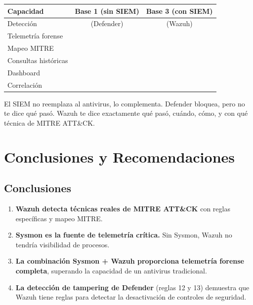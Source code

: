 \documentclass[11pt,a4paper]{article}
\begin{document}
	\begin{table}[H]
		\centering
		\begin{tabular}{@{}lcc@{}}
			\toprule
			\textbf{Capacidad} & \textbf{Base 1 (sin SIEM)} & \textbf{Base 3 (con SIEM)} \\ \midrule
			Detección & \textcolor{purplegreen}{\checkmark} (Defender) & \textcolor{purplegreen}{\checkmark} (Wazuh) \\
			Telemetría forense & \textcolor{purplered}{\texttimes} & \textcolor{purplegreen}{\checkmark} \\
			Mapeo MITRE & \textcolor{purplered}{\texttimes} & \textcolor{purplegreen}{\checkmark} \\
			Consultas históricas & \textcolor{purplered}{\texttimes} & \textcolor{purplegreen}{\checkmark} \\
			Dashboard & \textcolor{purplered}{\texttimes} & \textcolor{purplegreen}{\checkmark} \\
			Correlación & \textcolor{purplered}{\texttimes} & \textcolor{purplegreen}{\checkmark} \\
			\bottomrule
		\end{tabular}
	\end{table}
	
	\begin{okbox}
		El SIEM no reemplaza al antivirus, lo complementa. Defender bloquea, pero no te dice qué pasó. Wazuh te dice exactamente qué pasó, cuándo, cómo, y con qué técnica de MITRE ATT\&CK.
	\end{okbox}
	
	\section{Conclusiones y Recomendaciones}
	
	\subsection{Conclusiones}
	
	\begin{enumerate}[leftmargin=1.5em]
		\item \textbf{Wazuh detecta técnicas reales de MITRE ATT\&CK} con reglas específicas y mapeo MITRE.
		\item \textbf{Sysmon es la fuente de telemetría crítica.} Sin Sysmon, Wazuh no tendría visibilidad de procesos.
		\item \textbf{La combinación Sysmon + Wazuh proporciona telemetría forense completa}, superando la capacidad de un antivirus tradicional.
		\item \textbf{La detección de tampering de Defender} (reglas 12 y 13) demuestra que Wazuh tiene reglas para detectar la desactivación de controles de seguridad.
	\end{enumerate}
	
\end{document}
